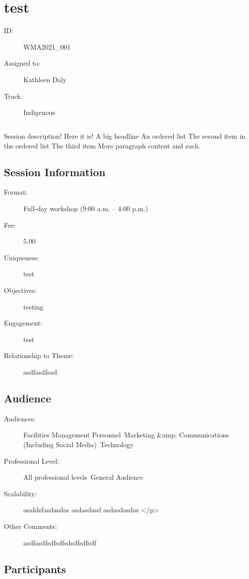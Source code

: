 \documentclass{report}
\begin{document}
  
        
          \newpage
          \section{ test }
            \begin{description}
              \item [ID:]
              WMA2021\_001

              \item [Assigned to:]Kathleen Daly~
                \item [Track:]Indigenous~
              \end{description}
              \subsection*{}
                 Session description! Here it is!  A big headline  An ordered list The second item in the ordered list The third item  More paragraph content and such.

              \subsection*{Session Information}
                \begin{description}
                  \item [Format:] Full-day workshop (9:00 a.m. – 4:00 p.m.)
							    
								  \item [Fee:]5.00
							     
							    \item [Uniqueness:]test
							    \item [Objectives:]testing
							    \item [Engagement:]test
							    \item [Relationship to Theme:]asdfasdfsad
							    
                \end{description}
              \subsection*{Audience}
                \begin{description}
                  \item [Audiences:]Facilities Management Personnel~Marketing &amp; Communications (Including Social Media)~Technology~
                  \item[Professional Level:]All professional levels~General Audience~
                \item[Scalability:] asafdsfasdasdas
asdasdasd
asdasdasdas
</p>
							
              \item[Other Comments:] asdfasdfsdfsdfsdsdfsdfsdf
              \end{description}
            \subsection*{Participants}
              





    
  

  
\end{document}
